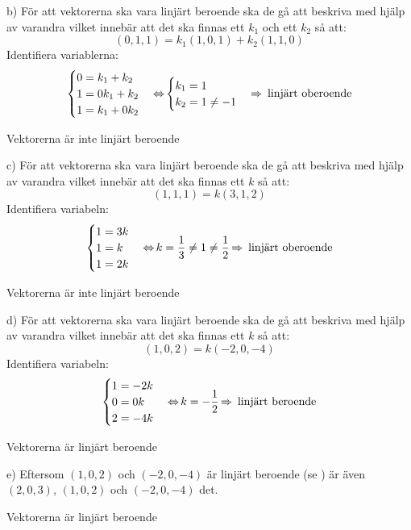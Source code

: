 \begin{task}{b)}
	För att vektorerna ska vara linjärt beroende ska de gå att beskriva med hjälp av varandra vilket innebär att det ska finnas ett $k_1$ och ett $k_2$ så att:
	\[(0,1,1)=k_1(1,0,1)+k_2(1,1,0)\]
	Identifiera variablerna:
	\[\begin{cases}
		0=k_1+k_2 \\
		1=0k_1+k_2 \\
		1=k_1+0k_2
	\end{cases} \operatorname{\Leftrightarrow}
	\begin{cases}
		k_1=1 \\
		k_2=1\neq-1
	\end{cases} \operatorname{\Rightarrow} \text{ linjärt oberoende}\]
	
	\ans Vektorerna är inte linjärt beroende
\end{task}

\begin{task}{c)}
	För att vektorerna ska vara linjärt beroende ska de gå att beskriva med hjälp av varandra vilket innebär att det ska finnas ett $k$ så att:
	\[(1,1,1)=k(3,1,2)\]
	Identifiera variabeln:
	\[\begin{cases}
		1=3k \\
		1=k \\
		1=2k
	\end{cases} \operatorname{\Leftrightarrow}
	k=\frac{1}{3}\neq1\neq\frac{1}{2} \operatorname{\Rightarrow} \text{ linjärt oberoende}\]
	
	\ans Vektorerna är inte linjärt beroende
\end{task}

\begin{task}{d)}
	För att vektorerna ska vara linjärt beroende ska de gå att beskriva med hjälp av varandra vilket innebär att det ska finnas ett $k$ så att:
	\[(1,0,2)=k(-2,0,-4)\]
	Identifiera variabeln:
	\[\begin{cases}
		1=-2k \\
		0=0k \\
		2=-4k
	\end{cases} \operatorname{\Leftrightarrow}
	k=-\frac{1}{2} \operatorname{\Rightarrow} \text{ linjärt beroende}\]
	
	\ans Vektorerna är linjärt beroende
\end{task}

\begin{task}{e)}
	Eftersom $(1,0,2)$ och $(-2,0,-4)$ är linjärt beroende (se ) är även $(2,0,3)$, $(1,0,2)$ och $(-2,0,-4)$ det.
	
	\ans Vektorerna är linjärt beroende
\end{task}

